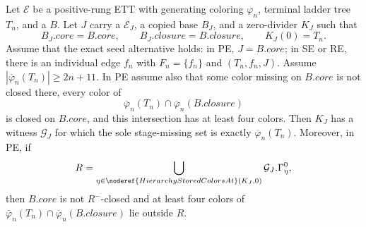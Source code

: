 \begin{helper}
Let $\mathcal E$ be a positive-rung ETT with generating coloring
$\varphi_n$, terminal ladder tree $T_n$, and a
 $B$.
Let $J$ carry a
 $\mathcal E_J$, a copied
base $B_J$, and a zero-divider  $K_J$ such
that
\[
 B_J.\mathit{core}=B.\mathit{core},\qquad
 B_J.\mathit{closure}=B.\mathit{closure},\qquad K_J(0)=T_n.
\]
Assume that the exact seed alternative holds: in PE,
$J=B.\mathit{core}$; in SE or RE, there is an individual edge $f_n$ with
$F_n=\{f_n\}$ and
$(T_n,f_n,J)$.  Assume
$|\overline\varphi_n(T_n)|\geq 2n+11$.  In PE assume also that some
color missing on $B.\mathit{core}$ is not closed there, every color of
\[
 \overline\varphi_n(T_n)\cap
 \overline\varphi_n(B.\mathit{closure})
\]
is closed on $B.\mathit{core}$, and this intersection has at least four
colors.  Then $K_J$ has a  witness
$\mathcal G_J$ for which the sole stage-missing set is exactly
$\overline\varphi_n(T_n)$.  Moreover, in PE, if
\[
 R=\bigcup_{\eta\in\noderef{HierarchyStoredColorsAt}(K_J,0)}
      \mathcal G_J.\Gamma^0_\eta,
\]
then $B.\mathit{core}$ is not $R^-$-closed and at least four colors of
$\overline\varphi_n(T_n)\cap
\overline\varphi_n(B.\mathit{closure})$ lie outside $R$.
\end{helper}
